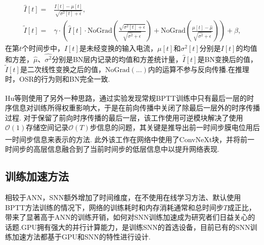 \documentclass[10.5pt,compsoc,UTF8]{CjC}
\theoremstyle{mystyle}
\newcommand{\upcite}[1]{\textsuperscript{\cite{#1}}}
\begin{document}
\begin{multicols}{1}
\begin{align}
	{\hat{I}}[t] =& \frac{ I[t] - \mu[t]}{\sqrt{\sigma^2[t] + \epsilon}}, \label{eq_OSR_1} \\
	{\tilde{I}}[t] =& \gamma \cdot \left( {\hat{I}}[t] \cdot \text{NoGrad}\left( \frac{\sqrt{\sigma^2[t] + \epsilon}}{\sqrt{\hat{\sigma^2} + \epsilon}} \right) + \text{NoGrad} \left( \frac{\mu[t] - \hat{\mu}}{\sqrt{\hat{\sigma^2} + \epsilon}} \right) \right) + \beta, \label{eq_OSR_2}
\end{align}
在第$t$个时间步中，$ I[t]$是未经变换的输入电流，$\mu[t]$和$\sigma^2[t]$分别是$ I[t]$的均值和方差，$\hat{\mu}$、$\hat{\sigma^2}$分别是BN层内记录的均值和方差统计量，$\hat{I}[t]$是BN变换后的值，$\tilde{I}[t]$是二次线性变换之后的值，$\text{NoGrad}(...)$内的运算不参与反向传播.在推理时，OSR的行为则和BN完全一致.

Hu等\upcite{hu2024highperformance}则使用了另外一种思路，通过实验发现常规BPTT训练中只有最后一层的时序信息对训练所得权重影响大，于是在前向传播中关闭了除最后一层外的时序传播过程.
对于保留了前向时序传播的最后一层，该工作使用可逆模块解决了使用$\mathcal{O}(1)$存储空间记录$\mathcal{O}(T)$步信息的问题，其关键是推导出前一时间步膜电位用后一时间步信息来表示的方法.
此外该工作在网络中使用了ConvNeXt块\upcite{liu2022convnet}，并将前一时间步的高层信息融合到了当前时间步的低层信息中以提升网络表现.

\subsection{训练加速方法}
相较于ANN，SNN额外增加了时间维度，在不使用在线学习方法、默认使用BPTT方法训练的情况下，网络的训练耗时和内存消耗通常和总时间步$T$成正比，带来了显著高于ANN的训练开销，如何对SNN训练加速成为研究者们日益关心的话题.GPU拥有强大的并行计算能力，是训练SNN的首选设备，目前已有的SNN训练加速方法都基于GPU和SNN的特性进行设计.


\end{multicols}
\end{document}
